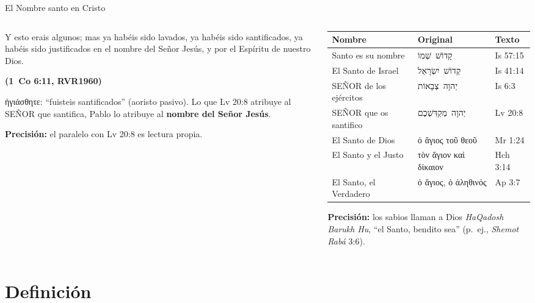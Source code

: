 \documentclass[hyperref={bookmarks=false},aspectratio=169]{beamer}
\newcommand{\heb}[1]{\mbox{\foreignlanguage{hebrew}{#1}}}
\newcommand{\grc}[1]{\foreignlanguage{ancientgreek}{#1}}
\newcommand{\SENOR}{S{\fontsize{0.78em}{1em}\selectfont EÑOR}}
\newcommand{\fuente}[1]{\par\hfill{\upshape\bfseries\footnotesize\textcolor{azul}{#1}}}
\newcommand{\destacar}[1]{\textbf{\textcolor{azul}{#1}}}
\newcommand{\precision}[1]{{\footnotesize\color{gris}\textbf{Precisión:} #1}}
\begin{document}
\begin{frame}{El Nombre santo en Cristo}
\begin{columns}[c,onlytextwidth]
\begin{column}{0.44\textwidth}
\begin{cita}Y esto erais algunos; mas ya habéis sido lavados, ya habéis sido santificados, ya habéis sido justificados en el nombre del Señor Jesús, y por el Espíritu de nuestro Dios.\fuente{(1~Co 6:11, RVR1960)}\end{cita}
\scriptsize \grc{ἡγιάσθητε}: ``fuisteis santificados'' (aoristo pasivo). Lo que Lv 20:8 atribuye al \SENOR{} que santifica, Pablo lo atribuye al \destacar{nombre del Señor Jesús}.\par\smallskip
\precision{el paralelo con Lv 20:8 es lectura propia.}
\end{column}
\begin{column}{0.54\textwidth}\scriptsize
\renewcommand{\arraystretch}{1.15}
\begin{tabular}{@{}>{\RaggedRight\arraybackslash}p{2.6cm}>{\RaggedRight\arraybackslash}p{2.0cm}>{\RaggedRight\arraybackslash}p{1.9cm}@{}}
\toprule
\textbf{Nombre} & \textbf{Original} & \textbf{Texto} \\ \midrule
Santo es su nombre & \heb{קָדוֹשׁ שְׁמוֹ} & Is 57:15 \\
El Santo de Israel & \heb{קְדוֹשׁ יִשְׂרָאֵל} & Is 41:14 \\
\SENOR{} de los ejércitos & \heb{יְהוָה צְבָאוֹת} & Is 6:3 \\
\SENOR{} que os santifico & \heb{יְהוָה מְקַדִּשְׁכֶם} & Lv 20:8 \\
El Santo de Dios & \grc{ὁ ἅγιος τοῦ θεοῦ} & Mr 1:24 \\
El Santo y el Justo & \grc{τὸν ἅγιον καὶ δίκαιον} & Hch 3:14 \\
El Santo, el Verdadero & \grc{ὁ ἅγιος, ὁ ἀληθινός} & Ap 3:7 \\
\bottomrule
\end{tabular}\par\smallskip
\precision{los sabios llaman a Dios \emph{HaQadosh Barukh Hu}, ``el Santo, bendito sea'' (p.~ej., \emph{Shemot Rabá} 3:6).}
\end{column}
\end{columns}
\end{frame}

\section{Definición}
\end{document}
